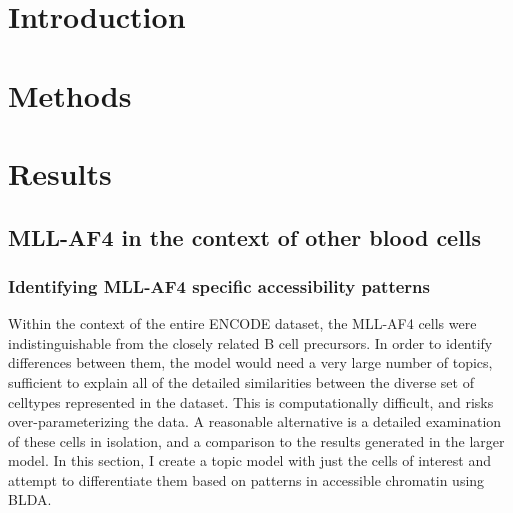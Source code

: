

\section{Introduction} \label{ch5:intro}

\section{Methods} \label{ch5:methods}

\section{Results} \label{ch5:results}

\subsection{MLL-AF4 in the context of other blood cells}

\subsubsection{Identifying MLL-AF4 specific accessibility patterns}

Within the context of the entire ENCODE dataset, the MLL-AF4 cells were indistinguishable from the closely related B cell precursors. In order to identify differences between them, the model would need a very large number of topics, sufficient to explain all of the detailed similarities between the diverse set of celltypes represented in the dataset. This is computationally difficult, and risks over-parameterizing the data. A reasonable alternative is a detailed examination of these cells in isolation, and a comparison to the results generated in the larger model. In this section, I create a topic model with just the cells of interest and attempt to differentiate them based on patterns in accessible chromatin using BLDA.

